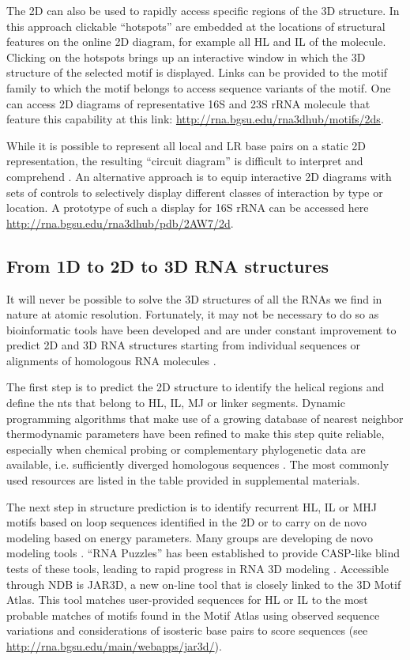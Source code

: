 The 2D can also be used to rapidly access specific regions of the 3D structure.
In this approach clickable ``hotspots'' are embedded at the locations of
structural features on the online 2D diagram, for example all HL and IL of the
molecule. Clicking on the hotspots brings up an interactive window in which the
3D structure of the selected motif is displayed. Links can be provided to the
motif family to which the motif belongs to access sequence variants of the
motif. One can access 2D diagrams of representative 16S and 23S rRNA molecule
that feature this capability at this link:
\url{http://rna.bgsu.edu/rna3dhub/motifs/2ds}.

While it is possible to represent all local and LR base pairs on a static 2D
representation, the resulting ``circuit diagram'' is difficult to interpret and
comprehend \cite{Lescoute2006a}. An alternative approach is to equip interactive
2D diagrams with sets of controls to selectively display different classes of
interaction by type or location. A prototype of such a display for 16S rRNA can
be accessed here \url{http://rna.bgsu.edu/rna3dhub/pdb/2AW7/2d}.

\subsection{From 1D to 2D to 3D RNA structures}

It will never be possible to solve the 3D structures of all the RNAs we find in
nature at atomic resolution. Fortunately, it may not be necessary to do so as
bioinformatic tools have been developed and are under constant improvement to
predict 2D and 3D RNA structures starting from individual sequences or
alignments of homologous RNA molecules \cite{Leontis2012e}. 

The first step is to predict the 2D structure to identify the helical regions
and define the nts that belong to HL, IL, MJ or linker segments. Dynamic
programming algorithms that make use of a growing database of nearest neighbor
thermodynamic parameters have been refined to make this step quite reliable,
especially when chemical probing or complementary phylogenetic data are
available, i.e. sufficiently diverged homologous sequences \cite{Aigner2012}.
The most commonly used resources are listed in the table provided in
supplemental materials. 

The next step in structure prediction is to identify recurrent HL, IL or MHJ
motifs based on loop sequences identified in the 2D or to carry on de novo
modeling based on energy parameters. Many groups are developing de novo modeling
tools \cite{Rother2012a, Sijenyi2012, Flores2012, Ding2012a, Cao2012}. ``RNA
Puzzles'' has been established to provide CASP-like blind tests of these tools,
leading to rapid progress in RNA 3D modeling \cite{Cruz2012}. Accessible through
NDB is JAR3D, a new on-line tool that is closely linked to the 3D Motif Atlas.
This tool matches user-provided sequences for HL or IL to the most probable
matches of motifs found in the Motif Atlas using observed sequence variations
and considerations of isosteric base pairs to score sequences (see
\url{http://rna.bgsu.edu/main/webapps/jar3d/}).

